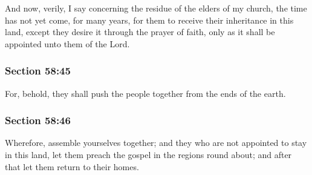 		And now, verily, I say concerning the residue of the elders of my church, the time has not yet come, for many years, for them to receive their inheritance in this land, except they desire it through the prayer of faith, only as it shall be appointed unto them of the Lord.


	\subsubsection{Section 58:45} %
		\label{DC58-45}

		For, behold, they shall push the people together from the ends of the earth.


	\subsubsection{Section 58:46} %
		\label{DC58-46}

		Wherefore, assemble yourselves together; and they who are not appointed to stay in this land, let them preach the gospel in the regions round about; and after that let them return to their homes.


